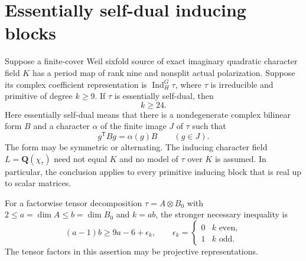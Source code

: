 \section{Essentially self-dual inducing blocks}
\label{sec:essential-selfdual-blocks}

\begin{theorem}
\label{D-BI-09}
Suppose a finite-cover Weil sixfold source of exact imaginary quadratic
character field $K$ has a period map of rank nine and nonsplit actual
polarization.  Suppose its complex coefficient representation is
$\operatorname{Ind}_H^G\tau$, where $\tau$ is irreducible and primitive
of degree $k\ge9$.  If $\tau$ is essentially self-dual, then
\[
                         k\ge24.                         \tag{BI.17}
\]
Here essentially self-dual means that there is a nondegenerate complex
bilinear form $B$ and a character $\alpha$ of the finite image $J$ of
$\tau$ such that
\[
              g^{\mathsf T}Bg=\alpha(g)B\qquad(g\in J).
                                                               \tag{BI.18}
\]
The form may be symmetric or alternating.  The inducing character field
$L=\mathbf Q(\chi_\tau)$ need not equal $K$ and no model of $\tau$
over $K$ is assumed.  In particular, the conclusion applies to every
primitive inducing block that is real up to scalar matrices.

For a factorwise tensor decomposition $\tau=A\otimes B_0$ with
$2\le a=\dim A\le b=\dim B_0$ and $k=ab$, the stronger necessary
inequality is
\[
 (a-1)b\ge 9a-6+\epsilon_k,
 \qquad \epsilon_k=\begin{cases}0&k\text{ even},\\1&k\text{ odd}.
 \end{cases}                                                 \tag{BI.19}
\]
The tensor factors in this assertion may be projective representations.
\end{theorem}
